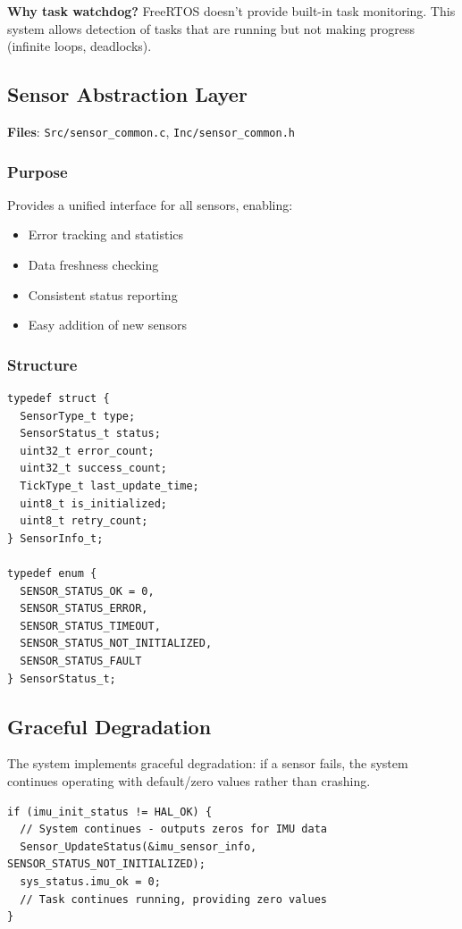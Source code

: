 \documentclass[11pt,a4paper]{article}
\begin{document}
\textbf{Why task watchdog?} FreeRTOS doesn't provide built-in task monitoring. This system allows detection of tasks that are running but not making progress (infinite loops, deadlocks).

\subsection{Sensor Abstraction Layer}
\textbf{Files}: \texttt{Src/sensor\_common.c}, \texttt{Inc/sensor\_common.h}

\subsubsection{Purpose}
Provides a unified interface for all sensors, enabling:
\begin{itemize}
    \item Error tracking and statistics
    \item Data freshness checking
    \item Consistent status reporting
    \item Easy addition of new sensors
\end{itemize}

\subsubsection{Structure}
\begin{lstlisting}[caption=Sensor Info Structure, label=lst:sensorinfo]
typedef struct {
  SensorType_t type;
  SensorStatus_t status;
  uint32_t error_count;
  uint32_t success_count;
  TickType_t last_update_time;
  uint8_t is_initialized;
  uint8_t retry_count;
} SensorInfo_t;

typedef enum {
  SENSOR_STATUS_OK = 0,
  SENSOR_STATUS_ERROR,
  SENSOR_STATUS_TIMEOUT,
  SENSOR_STATUS_NOT_INITIALIZED,
  SENSOR_STATUS_FAULT
} SensorStatus_t;
\end{lstlisting}

\subsection{Graceful Degradation}
The system implements graceful degradation: if a sensor fails, the system continues operating with default/zero values rather than crashing.

\begin{lstlisting}[caption=Graceful Degradation Example, label=lst:degradation]
if (imu_init_status != HAL_OK) {
  // System continues - outputs zeros for IMU data
  Sensor_UpdateStatus(&imu_sensor_info, SENSOR_STATUS_NOT_INITIALIZED);
  sys_status.imu_ok = 0;
  // Task continues running, providing zero values
}
\end{lstlisting}
\end{document}

